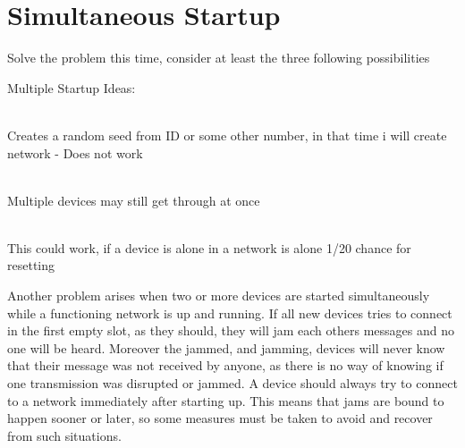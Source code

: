 \section{Simultaneous Startup} %
\label{sec:simultaneous_startup}

Solve the problem this time, consider at least the three following possibilities

\noindent
Multiple Startup Ideas:

\begin{description}[labelindent=\parindent]
    \item[Random Seed]\hfill\\ 
    Creates a random seed from ID or some other number, in that time i will create network - Does not work

    \item[Chante to create]\hfill\\
    Multiple devices may still get through at once

    \item[Reset if alone]\hfill\\
    This could work, if a device is alone in a network is alone  1/20 chance for resetting
\end{description}   

\noindent
Another problem arises when two or more devices are started simultaneously while a functioning network is up and running.
If all new devices tries to connect in the first empty slot, as they should, they will jam each others messages and no one will be heard.
Moreover the jammed, and jamming, devices will never know that their message was not received by anyone, as there is no way of knowing if one transmission was disrupted or jammed.
A device should always try to connect to a network immediately after starting up.
This means that jams are bound to happen sooner or later, so some measures must be taken to avoid and recover from such situations.

